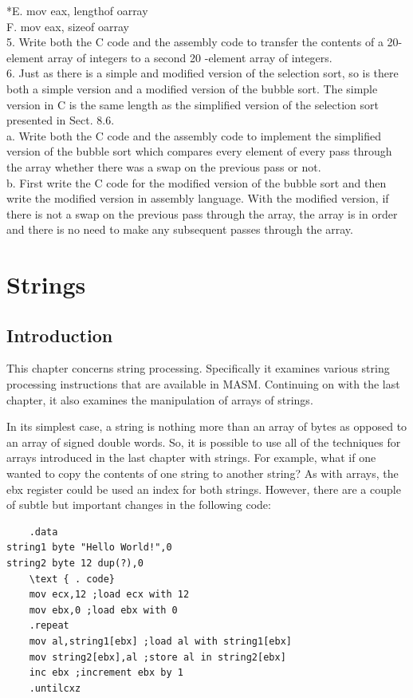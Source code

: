 \documentclass[10pt]{book}
\begin{document}
*E. mov eax, lengthof oarray\\
F. mov eax, sizeof oarray\\
5. Write both the C code and the assembly code to transfer the contents of a 20-element array of integers to a second 20 -element array of integers.\\
6. Just as there is a simple and modified version of the selection sort, so is there both a simple version and a modified version of the bubble sort. The simple version in C is the same length as the simplified version of the selection sort presented in Sect. 8.6.\\
a. Write both the C code and the assembly code to implement the simplified version of the bubble sort which compares every element of every pass through the array whether there was a swap on the previous pass or not.\\

b. First write the C code for the modified version of the bubble sort and then write the modified version in assembly language. With the modified version, if there is not a swap on the previous pass through the array, the array is in order and there is no need to make any subsequent passes through the array.

\chapter{Strings}
\section{Introduction}
This chapter concerns string processing. Specifically it examines various string processing instructions that are available in MASM. Continuing on with the last chapter, it also examines the manipulation of arrays of strings.

In its simplest case, a string is nothing more than an array of bytes as opposed to an array of signed double words. So, it is possible to use all of the techniques for arrays introduced in the last chapter with strings. For example, what if one wanted to copy the contents of one string to another string? As with arrays, the ebx register could be used an index for both strings. However, there are a couple of subtle but important changes in the following code:

\begin{verbatim}
    .data
string1 byte "Hello World!",0
string2 byte 12 dup(?),0
    \text { . code}
    mov ecx,12 ;load ecx with 12
    mov ebx,0 ;load ebx with 0
    .repeat
    mov al,string1[ebx] ;load al with string1[ebx]
    mov string2[ebx],al ;store al in string2[ebx]
    inc ebx ;increment ebx by 1
    .untilcxz
\end{verbatim}
\end{document}
